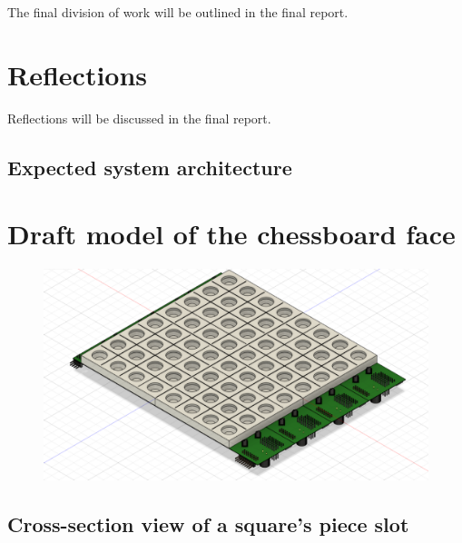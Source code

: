 \documentclass{article}
\begin{document}
The final division of work will be outlined in the final report.

\section{Reflections}

Reflections will be discussed in the final report.

\begin{appendices}
	\begin{landscape}
		\section{Expected system architecture}
		\begin{figure}[H]
			
		\end{figure}
	\end{landscape}

	\section{Draft model of the chessboard face}

	\begin{figure}[H]
		\includegraphics[width=\textwidth]{appendix/board.png}
	\end{figure}

	\begin{landscape}
		\section{Cross-section view of a square's piece slot}

		\begin{figure}[H]
			
		\end{figure}
	\end{landscape}


\end{appendices}
\end{document}
